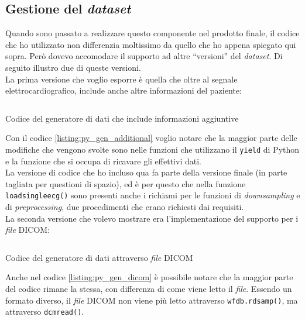 \subsection{Gestione del \textit{dataset}}\noindent
Quando sono passato a realizzare questo componente nel prodotto finale, il codice che ho utilizzato non differenzia moltissimo da quello che ho appena spiegato qui sopra.
Però dovevo accomodare il supporto ad altre ``versioni'' del \textit{dataset}. Di seguito illustro due di queste versioni.\\
La prima versione che voglio esporre è quella che oltre al segnale elettrocardiografico, include anche altre informazioni del paziente:
\begin{listing}[H]
    \inputminted{python}{code/generator_additional.py}
    \caption{Codice del generatore di dati che include informazioni aggiuntive}
    \label{listing:py_gen_additional}
\end{listing}\noindent
Con il codice \ref{listing:py_gen_additional} voglio notare che la maggior parte delle modifiche che vengono svolte sono nelle funzioni che utilizzano il \texttt{yield} di Python e la funzione che si occupa di ricavare gli effettivi dati.\\
La versione di codice che ho incluso qua fa parte della versione finale (in parte tagliata per questioni di spazio), ed è per questo che nella funzione \texttt{\textunderscore load\textunderscore single\textunderscore ecg()} sono presenti anche i richiami per le funzioni di \textit{downsampling} e di \textit{preprocessing}, due procedimenti che erano richiesti dai requisiti.\\
La seconda versione che volevo mostrare era l'implementazione del supporto per i \textit{file} DICOM:
\begin{listing}[H]
    \inputminted{python}{code/generator_dicom.py}
    \caption{Codice del generatore di dati attraverso \textit{file} DICOM}
    \label{listing:py_gen_dicom}
\end{listing}\noindent
Anche nel codice \ref{listing:py_gen_dicom} è possibile notare che la maggior parte del codice rimane la stessa, con differenza di come viene letto il \textit{file}. Essendo un formato diverso, il \textit{file} DICOM non viene più letto attraverso \texttt{wfdb.rdsamp()}, ma attraverso \texttt{dcmread()}.

